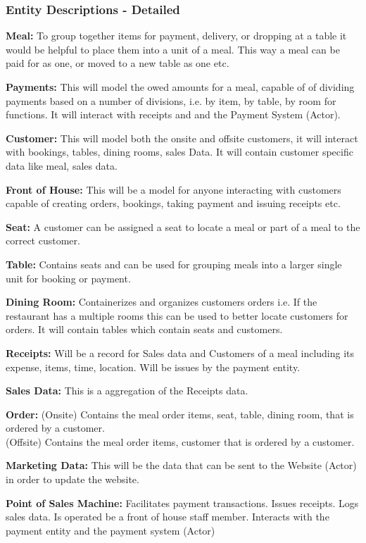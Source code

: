 \documentclass{article}
\begin{document}
\subsubsection{Entity Descriptions - Detailed}
\textbf{Meal:} To group together items for payment, delivery, or dropping at a table it would be helpful to place them into a unit of a meal. This way a meal can be paid for as one, or moved to a new table as one etc.

\textbf{Payments:} This will model the owed amounts for a meal, capable of of dividing payments based on a number of divisions, i.e. by item, by table, by room for functions. It will interact with receipts and and the Payment System (Actor).

\textbf{Customer:} This will model both the onsite and offsite customers, it will interact with bookings, tables, dining rooms, sales Data. It will contain customer specific data like meal, sales data.

\textbf{Front of House:} This will be a model for anyone interacting with customers capable of creating orders, bookings, taking payment and issuing receipts etc.

\textbf{Seat:} A customer can be assigned a seat to locate a meal or part of a meal to the correct customer.

\textbf{Table:} Contains seats and can be used for grouping meals into a larger single unit for booking or payment.

\textbf{Dining Room:} Containerizes and organizes customers orders i.e. If the restaurant has a multiple rooms this can be used to better locate customers for orders. It will contain tables which contain seats and customers.

\textbf{Receipts:} Will be a record for Sales data and Customers of a meal including its expense, items, time, location. Will be issues by the payment entity.

\textbf{Sales Data:} This is a aggregation of the Receipts data.

\textbf{Order:} (Onsite) Contains the meal order items, seat, table, dining room, that is ordered by a customer. \\(Offsite) Contains the meal order items, customer that is ordered by a customer.

\textbf{Marketing Data:} This will be the data that can be sent to the Website (Actor) in order to update the website.

\textbf{Point of Sales Machine:} Facilitates payment transactions. Issues receipts. Logs sales data. Is operated be a front of house staff member. Interacts with the payment entity and the payment system (Actor)
\end{document}
